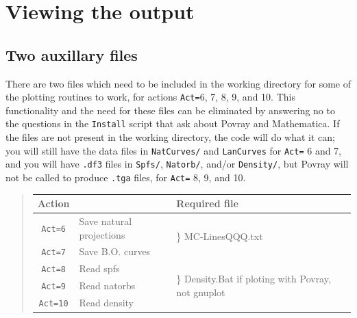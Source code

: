 \documentclass[10pt,leqno, oneside]{book}
\begin{document}
\chapter{Viewing the output}

\section{Two auxillary files}

There are two files which need to be included in the working directory for some of the plotting routines to work, for actions \verb#Act=#6, 7, 8, 9, and 10.  This functionality and the need for these files can be eliminated by answering no to the questions in the \verb#Install# script that ask about Povray and Mathematica.  If the files are not present in the working directory, the code will do what it can; you will still have the data files in \verb#NatCurves/# and \verb#LanCurves# for \verb#Act=# 6 and 7, and you will have \verb#.df3# files in \verb#Spfs/#, \verb#Natorb/#, and/or \verb#Density/#, but Povray will not be called to produce \verb#.tga# files, for \verb#Act=# 8, 9, and 10.
\begin{quote}
\begin{tabular}{cll}
Action & & Required file \\
\hline
\verb#Act=6# & Save natural projections & \multirow{2}{*}{{\Large\}} MC-LinesQQQ.txt} \\
\verb#Act=7# & Save B.O. curves & \\
\verb#Act=8# & Read spfs & \multirow{3}{*}{{\Huge\}} Density.Bat if  ploting with Povray, not gnuplot }\\
\verb#Act=9# & Read natorbs &\\
\verb#Act=10# & Read density &\\
\end{tabular}
\end{quote}


\end{document}
